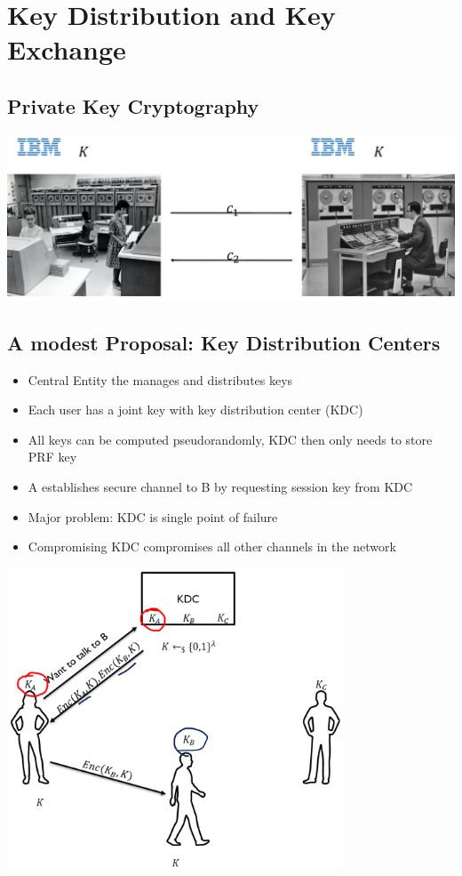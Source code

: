 

\chapter{Key Distribution and Key Exchange}
	
\section{Private Key Cryptography}
	\begin{center}
		\includegraphics[width=140mm]{Graphics/Key Distribution and Key Exchange/kdke1.png}
	\end{center}

\section{A modest Proposal: Key Distribution Centers}
	\begin{itemize}
		\item Central Entity the manages and distributes keys
		\item Each user has a joint key with key distribution center (KDC)
		\item All keys can be computed pseudorandomly, KDC then only needs to store PRF key
		\item A establishes secure channel to B by requesting session key from KDC
		\item Major problem: KDC is single point of failure
		\item Compromising KDC compromises all other channels in the network
	\end{itemize}
	\begin{center}
		\includegraphics[width=100mm]{Graphics/Key Distribution and Key Exchange/kdke2.png}
	\end{center}

